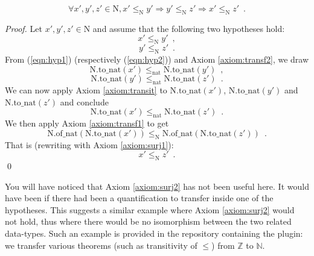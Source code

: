 \documentclass{llncs}
\begin{document}
\begin{example}
    \begin{theorem}
        \label{thm:transit}
        \[
            \forall x', y', z' \in \mathrm{N},
            x' \leq_{\mathrm{N}} y' \Rightarrow y' \leq_{\mathrm{N}} z' 
            \Rightarrow x' \leq_{\mathrm{N}} z' \enspace .
        \]
    \end{theorem}
    \begin{proof}
        Let $x', y', z' \in \mathrm{N}$
        and assume that the following two hypotheses hold:
        \begin{equation}
            \label{eqn:hyp1}
            x' \leq_{\mathrm{N}} y' \enspace ,
        \end{equation}
        \begin{equation}
            \label{eqn:hyp2}
            y' \leq_{\mathrm{N}} z' \enspace .
        \end{equation}
        From (\ref{eqn:hyp1}) (respectively (\ref{eqn:hyp2})) and Axiom \ref{axiom:transf2},
        we draw
        \begin{equation}
            \label{eqn:concl1}
            \mathrm{N.to\_nat}(x') \leq_{\mathrm{nat}}
            \mathrm{N.to\_nat}(y') \enspace ,
        \end{equation}
        \begin{equation}
            \label{eqn:concl2}
            \mathrm{N.to\_nat}(y') \leq_{\mathrm{nat}}
            \mathrm{N.to\_nat}(z') \enspace .
        \end{equation}
        We can now apply Axiom \ref{axiom:transit}
        to $\mathrm{N.to\_nat}(x')$,
        $\mathrm{N.to\_nat}(y')$ and $\mathrm{N.to\_nat}(z')$ and conclude
        \begin{equation}
            \label{eqn:concl3}
            \mathrm{N.to\_nat}(x') \leq_{\mathrm{nat}}
            \mathrm{N.to\_nat}(z') \enspace .
        \end{equation}
        We then apply Axiom \ref{axiom:transf1} to get
        \begin{equation}
            \mathrm{N.of\_nat}( \mathrm{N.to\_nat}(x') )
            \leq_{\mathrm{N}} \mathrm{N.of\_nat}( \mathrm{N.to\_nat}(z') ) \enspace .
        \end{equation}
        That is (rewriting with Axiom \ref{axiom:surj1}):
        \begin{equation}
            x' \leq_{\mathrm{N}} z' \enspace .
        \end{equation}
        \qed
    \end{proof}

    You will have noticed that Axiom \ref{axiom:surj2} has not been useful here.
    It would have been if there had been a quantification to transfer inside one of the hypotheses.
    This suggests a similar example where Axiom \ref{axiom:surj2} would not hold,
    thus where there would be no isomorphism between the two related data-types.
    Such an example is provided in the repository containing the plugin: we transfer various
    theorems (such as transitivity of $\leq$) from $\mathbb{Z}$ to $\mathbb{N}$.

\end{example}
\end{document}
